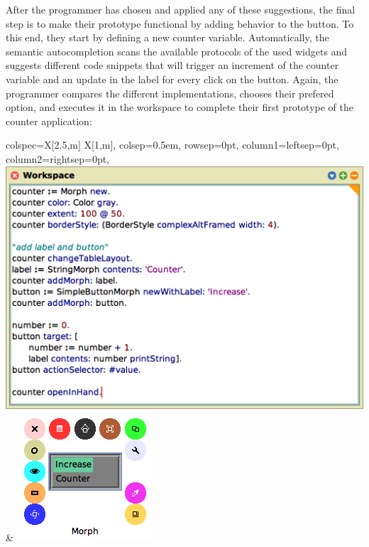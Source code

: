 After the programmer has chosen and applied any of these suggestions, the final step is to make their prototype functional by adding behavior to the button.
To this end, they start by defining a new counter variable.
Automatically, the semantic autocompletion scans the available protocols of the used widgets and suggests different code snippets that will trigger an increment of the counter variable and an update in the label for every click on the button.
Again, the programmer compares the different implementations, chooses their prefered option, and executes it in the workspace to complete their first prototype of the counter application:

\begin{center}
	\begin{tblr}{
		colspec={X[2.5,m] X[1,m]},
		colsep=0.5em,
		rowsep=0pt,
		column{1}={leftsep=0pt},
		column{2}={rightsep=0pt},
	}
		\includegraphics[width=\linewidth,valign=c]{01_suggestions/workspace_final.png} & %
		\includegraphics[width=\linewidth,valign=c]{01_suggestions/app_final.png} %

\end{tblr}
\end{center}
